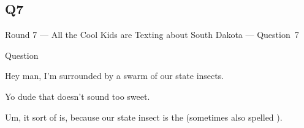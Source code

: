 \documentclass[11pt]{beamer}
\begin{document}
\subsection*{Q7}
\begin{frame}[t]{Round 7 --- All the Cool Kids are Texting about South Dakota --- \mbox{Question 7}}
\begin{block}{Question}

\begin{minipage}{0.9\textwidth}
\begin{mdframed}[
    roundcorner=7pt,
    backgroundcolor=black!5,
    linecolor=black!5,
    fontcolor=black,
    ignorelastdescenders]
\begin{flushleft}
{\small{}\selectfont{}
Hey man, I'm surrounded by a swarm of our state insects.
}
\end{flushleft}
\end{mdframed}
\end{minipage}

\hfill{}\begin{minipage}{0.9\textwidth}
\begin{mdframed}[
    roundcorner=7pt,
    backgroundcolor=blue!80!white,
    linecolor=blue!80!white,
    fontcolor=white,
    ignorelastdescenders]
\begin{flushleft}
{\small{}\selectfont{}
Yo dude that doesn't sound too sweet.
}
\end{flushleft}
\end{mdframed}
\end{minipage}

\begin{minipage}{0.9\textwidth}
\begin{mdframed}[
    roundcorner=7pt,
    backgroundcolor=black!5,
    linecolor=black!5,
    fontcolor=black,
    ignorelastdescenders]
\begin{flushleft}
{\small{}\selectfont{}
Um, it sort of is, because our state insect is the \textunderscore{}\textunderscore{}\textunderscore{}\textunderscore{}\textunderscore{}\textunderscore{} \textunderscore{}\textunderscore{}\textunderscore{}\textunderscore{}\textunderscore{}\textunderscore{} (sometimes also spelled \textunderscore{}\textunderscore{}\textunderscore{}\textunderscore{}\textunderscore{}\textunderscore{}).
}
\end{flushleft}
\end{mdframed}
\end{minipage}
\end{block}
\end{frame}
\end{document}
